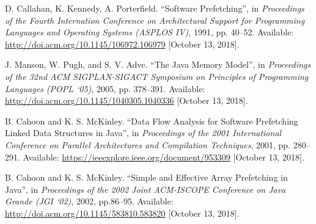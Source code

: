 \documentclass[journal,onecolumn]{IEEEtran}
\begin{document}
\begin{thebibliography}{1}

        D. Callahan, K. Kennedy, A. Porterfield.
        ``Software Prefetching'', in
        \textit{Proceedings of the Fourth Internation Conference on Architectural Support for Programming Languages and Operating Systems (ASPLOS IV)},
        1991, pp. 40--52.
        Available: \url{http://doi.acm.org/10.1145/106972.106979} [October 13, 2018].

        J. Manson, W. Pugh, and S. V. Adve.
        ``The Java Memory Model'', in
        \textit{Proceedings of the 32nd ACM SIGPLAN-SIGACT Symposium on Principles of Programming Languages (POPL `05)},
        2005, pp. 378--391.
        Available: \url{http://doi.acm.org/10.1145/1040305.1040336} [October 13, 2018].

        B. Cahoon and K. S. McKinley.
        ``Data Flow Analysis for Software Prefetching Linked Data Structures in Java'', in
        \textit{Proceedings of the 2001 International Conference on Parallel Architectures and Compilation Techniques},
        2001, pp. 280--291.
        Available: \url{https://ieeexplore.ieee.org/document/953309} [October 13, 2018].

        B. Cahoon and K. S. McKinley.
        ``Simple and Effective Array Prefetching in Java'', in
        \textit{Proceedings of the 2002 Joint ACM-ISCOPE Conference on Java Grande (JGI `02)},
        2002, pp.86--95.
        Available: \url{http://doi.acm.org/10.1145/583810.583820} [October 13, 2018].

\end{thebibliography}
\end{document}
